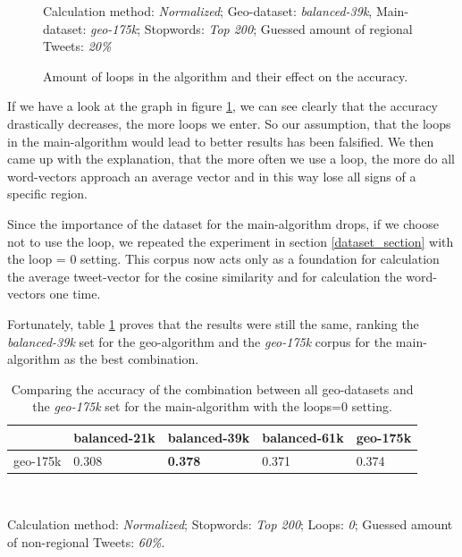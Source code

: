 \documentclass[./Main.tex]{subfiles}
\begin{document}
\begin{figure}[h]
Calculation method: \textit{Normalized}; Geo-dataset: \textit{balanced-39k}, Main-dataset: \textit{geo-175k}; Stopwords: \textit{Top 200}; Guessed amount of regional Tweets: \textit{20\%}
  \caption{Amount of loops in the algorithm and their effect on the accuracy.}
  \label{geo_graph3}
\end{figure}

If we have a look at the graph in figure \ref{geo_graph3}, we can see clearly  that the accuracy drastically decreases, the more loops we enter. So our assumption, that the loops in the main-algorithm would lead to better results has been falsified. We then came up with the explanation, that the more often we use a loop, the more do all word-vectors approach an average vector and in this way lose all signs of a specific region.

Since the importance of the dataset for the main-algorithm drops, if we choose not to use the loop, we repeated the experiment in section \ref{dataset_section} with the loop = 0 setting. This corpus now acts only as a foundation for calculation the average tweet-vector for the cosine similarity  and for calculation the word-vectors one time.

Fortunately, table \ref{geo_datasets2} proves that the results were still the same, ranking the \emph{balanced-39k} set for the geo-algorithm and the \emph{geo-175k} corpus for the main-algorithm as the best combination. 

\begin{table}[h]
\begin{center}
    \begin{tabular}{|l|llll|}
    \hline
                  & balanced-21k & balanced-39k   & balanced-61k & geo-175k \\ \hline
    geo-175k    & 0.308        & \textbf{0.378} & 0.371        & 0.374    \\ \hline
    \end{tabular} \\
\end{center}
  Calculation method: \textit{Normalized}; Stopwords: \textit{Top 200}; Loops: \textit{0}; Guessed amount of non-regional Tweets: \textit{60\%}.
  \caption{Comparing the accuracy of the combination between all geo-datasets and the \emph{geo-175k} set for the main-algorithm with the loops=0 setting.}
  \label{geo_datasets2}
\end{table}
\end{document}
